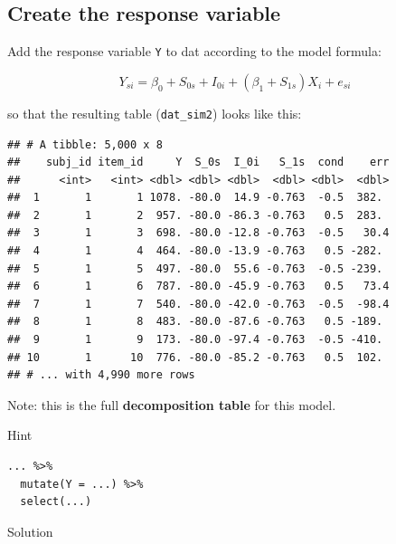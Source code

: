 \documentclass[]{book}
\newenvironment{Shaded}{\begin{snugshade}}{\end{snugshade}}
\newcommand{\DataTypeTok}[1]{\textcolor[rgb]{0.13,0.29,0.53}{#1}}
\newcommand{\KeywordTok}[1]{\textcolor[rgb]{0.13,0.29,0.53}{\textbf{#1}}}
\newcommand{\NormalTok}[1]{#1}
\newcommand{\OperatorTok}[1]{\textcolor[rgb]{0.81,0.36,0.00}{\textbf{#1}}}
\newcommand{\StringTok}[1]{\textcolor[rgb]{0.31,0.60,0.02}{#1}}
\begin{document}
\hypertarget{create-the-response-variable}{%
\subsection{Create the response variable}\label{create-the-response-variable}}

Add the response variable \texttt{Y} to dat according to the model formula:

\[Y_{si} = \beta_0 + S_{0s} + I_{0i} + (\beta_1 + S_{1s})X_{i} + e_{si}\]

so that the resulting table (\texttt{dat\_sim2}) looks like this:

\begin{verbatim}
## # A tibble: 5,000 x 8
##    subj_id item_id     Y  S_0s  I_0i   S_1s  cond    err
##      <int>   <int> <dbl> <dbl> <dbl>  <dbl> <dbl>  <dbl>
##  1       1       1 1078. -80.0  14.9 -0.763  -0.5  382. 
##  2       1       2  957. -80.0 -86.3 -0.763   0.5  283. 
##  3       1       3  698. -80.0 -12.8 -0.763  -0.5   30.4
##  4       1       4  464. -80.0 -13.9 -0.763   0.5 -282. 
##  5       1       5  497. -80.0  55.6 -0.763  -0.5 -239. 
##  6       1       6  787. -80.0 -45.9 -0.763   0.5   73.4
##  7       1       7  540. -80.0 -42.0 -0.763  -0.5  -98.4
##  8       1       8  483. -80.0 -87.6 -0.763   0.5 -189. 
##  9       1       9  173. -80.0 -97.4 -0.763  -0.5 -410. 
## 10       1      10  776. -80.0 -85.2 -0.763   0.5  102. 
## # ... with 4,990 more rows
\end{verbatim}

Note: this is the full \textbf{decomposition table} for this model.

Hint

\begin{verbatim}
... %>% 
  mutate(Y = ...) %>%
  select(...)
\end{verbatim}

Solution

\begin{Shaded}
\end{Shaded}
\end{document}
